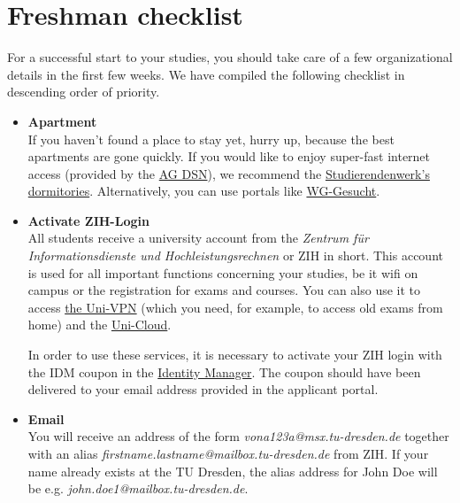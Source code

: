 \newcommand{\checkbox}[1]{\item[$\square$]\textbf{#1}\\}

\chapter{Freshman checklist}

For a successful start to your studies, you should take care of a few organizational details in the first few weeks.
We have compiled the following checklist in descending order of priority.

\begin{itemize}

\checkbox{Apartment}
If you haven't found a place to stay yet, hurry up, because the best apartments are gone quickly.
If you would like to enjoy super-fast internet access
(provided by the \href{https://www.agdsn.de}{AG DSN}), we recommend the 
\href{https://www.studentenwerk-dresden.de/wohnen/wohnheimkatalog}{Studierendenwerk's dormitories}.
Alternatively, you can use portals like \href{https://wg-gesucht.de}{WG-Gesucht}.

\checkbox{Activate ZIH-Login}
All students receive a university account from the \textit{Zentrum für Informationsdienste und Hochleistungsrechnen} or ZIH in short.
This account is used for all important functions concerning your studies, be it wifi on campus or the registration for exams and courses.
You can also use it to access 
\href{https://tu-dresden.de/zih/dienste/service-katalog/arbeitsumgebung/zugang_datennetz/vpn}{the Uni-VPN}
(which you need, for example, to access old exams from home) and the
\href{https://tu-dresden.de/zih/dienste/service-katalog/zusammenarbeiten-und-forschen/datenaustausch/cloudstore}{Uni-Cloud}.

In order to use these services, it is necessary to activate your ZIH login with the IDM coupon in the 
\href{https://idm-coupon.tu-dresden.de}{Identity Manager}.
The coupon should have been delivered to your email address provided in the applicant portal.

\checkbox{Email}
You will receive an address of the form 
\textit{vona123a@msx.tu-dresden.de}
together with an alias 
\textit{firstname.lastname@mailbox.tu-dresden.de} from ZIH.
If your name already exists at the TU Dresden, 
the alias address for John Doe will be e.g. 
\textit{john.doe1@mailbox.tu-dresden.de}. 


\end{itemize}
